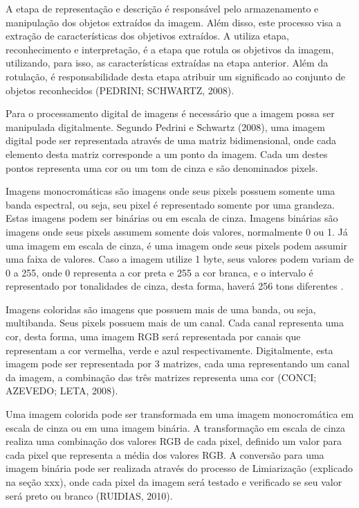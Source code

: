 \documentclass[
	12pt,				%
	oneside,			%
	a4paper,			%
	english,			%
	french,				%
	spanish,			%
	brazil,				%
	]{abntex2}
\begin{document}
A etapa de representação e descrição é responsável  pelo armazenamento e manipulação dos objetos extraídos da imagem. Além disso, este processo visa a extração de características dos objetivos extraídos. A utiliza etapa, reconhecimento e interpretação, é a etapa que rotula os objetivos da imagem, utilizando, para isso, as características extraídas na etapa anterior. Além da rotulação, é responsabilidade desta etapa atribuir um significado ao conjunto de objetos reconhecidos (PEDRINI; SCHWARTZ, 2008). 

Para o processamento digital de imagens é necessário que a imagem possa ser manipulada digitalmente. Segundo Pedrini e Schwartz (2008), uma imagem digital pode ser representada através de uma matriz bidimensional, onde cada elemento desta matriz corresponde a um ponto da imagem. Cada um destes pontos representa uma cor ou um tom de cinza e são denominados pixels. 

Imagens monocromáticas são imagens onde seus pixels possuem somente uma banda espectral, ou seja, seu pixel é representado somente por uma grandeza. Estas imagens podem ser binárias ou em escala de cinza. Imagens binárias são imagens onde seus pixels assumem somente dois valores, normalmente 0 ou 1. Já uma imagem em escala de cinza, é uma imagem onde seus pixels podem assumir uma faixa de valores. Caso a imagem utilize 1 byte, seus valores podem variam de 0 a 255, onde 0 representa a cor preta e 255 a cor branca, e o intervalo é representado por tonalidades de cinza, desta forma, haverá 256 tons diferentes \cite{conciAzevedoLeta:2008}.

Imagens coloridas são imagens que possuem mais de uma banda, ou seja, multibanda. Seus pixels possuem mais de um canal. Cada canal representa uma cor, desta forma, uma imagem RGB será representada por canais que representam a cor vermelha, verde e azul respectivamente. Digitalmente, esta imagem pode ser representada por 3 matrizes, cada uma representando um canal da imagem, a combinação das três matrizes representa uma cor (CONCI; AZEVEDO; LETA, 2008).

Uma imagem colorida pode ser transformada em uma imagem monocromática em escala de cinza ou em uma imagem binária. A transformação em escala de cinza realiza uma combinação dos valores RGB de cada pixel, definido um valor para cada pixel que representa a média dos valores RGB. A conversão para uma imagem binária pode ser realizada através do processo de Limiarização (explicado na seção xxx), onde cada pixel da imagem será testado e verificado se seu valor será preto ou branco (RUIDIAS, 2010).
\end{document}

